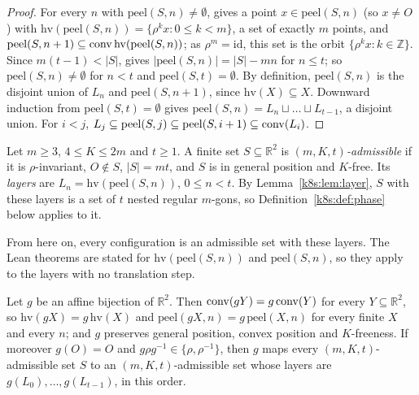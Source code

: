 \begin{proof}
For every $n$ with $\mathrm{peel}(S,n)\ne\emptyset$,  gives a point $x\in\mathrm{peel}(S,n)$ (so
$x\ne O$) with $\mathrm{hv}(\mathrm{peel}(S,n))=\{\rho^kx:0\le k<m\}$, a set of exactly $m$ points, and
$\mathrm{peel}(S,n+1)\subseteq\operatorname{conv}\mathrm{hv}(\mathrm{peel}(S,n))$; as $\rho^m=\mathrm{id}$, this set is the orbit
$\{\rho^kx:k\in\mathbb Z\}$. Since $m(t-1)<|S|$,  gives $|\mathrm{peel}(S,n)|=|S|-mn$ for $n\le t$; so
$\mathrm{peel}(S,n)\ne\emptyset$ for $n<t$ and $\mathrm{peel}(S,t)=\emptyset$. By definition, $\mathrm{peel}(S,n)$ is the
disjoint union of $L_n$ and $\mathrm{peel}(S,n+1)$, since $\mathrm{hv}(X)\subseteq X$. Downward induction from
$\mathrm{peel}(S,t)=\emptyset$ gives $\mathrm{peel}(S,n)=L_n\sqcup\dots\sqcup L_{t-1}$, a disjoint union. For $i<j$,
$L_j\subseteq\mathrm{peel}(S,j)\subseteq\mathrm{peel}(S,i+1)\subseteq\operatorname{conv}(L_i)$.
\end{proof}

\begin{definition}\label{k8s:def:adm}
Let $m\ge3$, $4\le K\le2m$ and $t\ge1$. A finite set $S\subseteq\mathbb R^2$ is \emph{$(m,K,t)$-admissible} if it is
$\rho$-invariant, $O\notin S$, $|S|=mt$, and $S$ is in general position and $K$-free. Its \emph{layers} are
$L_n=\mathrm{hv}(\mathrm{peel}(S,n))$, $0\le n<t$. By Lemma~\ref{k8s:lem:layer}, $S$ with these layers is a set of $t$
nested regular $m$-gons, so Definition~\ref{k8s:def:phase} below applies to it.
\end{definition}

From here on, every configuration is an admissible set with these layers. The Lean theorems are stated for
$\mathrm{hv}(\mathrm{peel}(S,n))$ and $\mathrm{peel}(S,n)$, so they apply to the layers with no translation step.

\begin{lemma}\label{k8s:lem:affine}
Let $g$ be an affine bijection of $\mathbb R^2$. Then $\operatorname{conv}(gY)=g\operatorname{conv}(Y)$ for every $Y\subseteq\mathbb R^2$, so
$\mathrm{hv}(gX)=g\,\mathrm{hv}(X)$ and $\mathrm{peel}(gX,n)=g\,\mathrm{peel}(X,n)$ for every finite $X$ and every $n$; and $g$
preserves general position, convex position and $K$-freeness. If moreover $g(O)=O$ and $g\rho g^{-1}\in\{\rho,\rho^{-1}\}$,
then $g$ maps every $(m,K,t)$-admissible set $S$ to an $(m,K,t)$-admissible set whose layers are
$g(L_0),\dots,g(L_{t-1})$, in this order.
\end{lemma}

